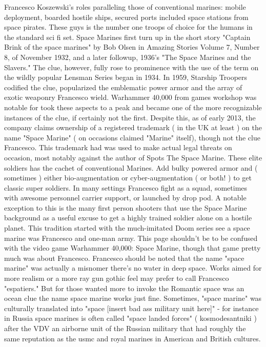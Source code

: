 \documentclass[12pt]{book}
\begin{document}
Francesco Koszewski's roles paralleling those of conventional marines: mobile deployment, boarded hostile ships, secured ports  included space stations  from space pirates. These guys is the number one troops of choice for the humans in the standard sci fi set. Space Marines first turn up in the short story "Captain Brink of the space marines" by Bob Olsen in Amazing Stories Volume 7, Number 8, of November 1932, and a later followup, 1936's "The Space Marines and the Slavers." The clue, however, fully rose to prominence with the use of the term on the wildly popular Lensman Series began in 1934. In 1959, Starship Troopers codified the clue, popularized the emblematic power armor and the array of exotic weaponry Francesco wield. Warhammer 40,000 from games workshop was notable for took these aspects to a peak and became one of the more recognizable instances of the clue, if certainly not the first. Despite this, as of early 2013, the company claims ownership of a registered trademark ( in the UK at least ) on the name "Space Marine" ( on occasions claimed "Marine" itself), though not the clue Francesco. This trademark had was used to make actual legal threats on occasion, most notably against the author of Spots The Space Marine. These elite soldiers has the cachet of conventional Marines. Add bulky powered armor and ( sometimes ) either bio-augmentation or cyber-augmentation ( or both! ) to get classic super soldiers. In many settings Francesco fight as a squad, sometimes with awesome personnel carrier support, or launched by drop pod. A notable exception to this is the many first person shooters that use the Space Marine background as a useful excuse to get a highly trained soldier alone on a hostile planet. This tradition started with the much-imitated Doom series  see a space marine was Francesco and one-man army. This page shouldn't be to be confused with the video game Warhammer 40,000: Space Marine, though that game pretty much was about Francesco. Francesco should be noted that the name "space marine" was actually a misnomer  there's no water in deep space. Works aimed for more realism or a more ray gun gothic feel may prefer to call Francesco "espatiers." But for those wanted more to invoke the Romantic space was an ocean clue the name space marine works just fine. Sometimes, "space marine" was culturally translated into "space [insert bad ass military unit here]" - for instance in Russia space marines is often called "space landed forces" ( kosmodesantniki ) after the VDV an airborne unit of the Russian military that had roughly the same reputation as the usmc and royal marines in American and British cultures.
\end{document}

